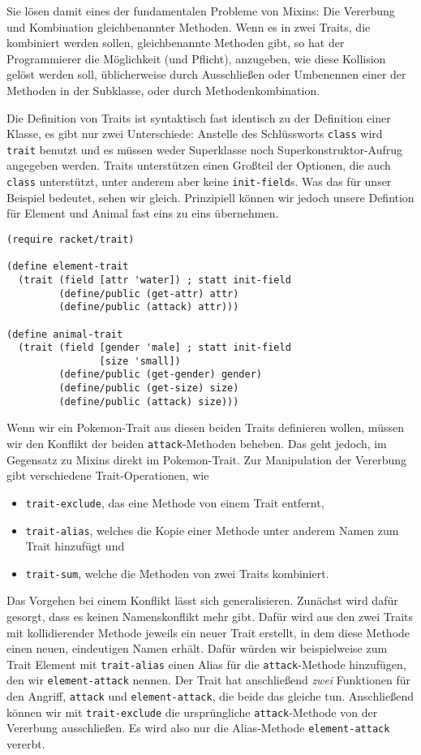 Sie lösen damit eines der fundamentalen Probleme von Mixins: Die Vererbung und Kombination gleichbenannter Methoden. Wenn es in zwei Traits, die kombiniert werden sollen, gleichbenannte Methoden gibt, so hat der Programmierer die Möglichkeit (und Pflicht), anzugeben, wie diese Kollision gelöst werden soll, üblicherweise durch Ausschließen oder Umbenennen einer der Methoden in der Subklasse, oder durch Methodenkombination.

Die Definition von Traits ist syntaktisch fast identisch zu der Definition einer Klasse, es gibt nur zwei Unterschiede: Anstelle des Schlüssworts \texttt{class} wird \texttt{trait} benutzt und es müssen weder Superklasse noch Superkonstruktor-Aufrug angegeben werden. Traits unterstützen einen Großteil der Optionen, die auch \texttt{class} unterstützt, unter anderem aber keine \texttt{init-field}s. Was das für unser Beispiel bedeutet, sehen wir gleich. Prinzipiell können wir jedoch unsere Defintion für Element und Animal fast eins zu eins übernehmen. 

\begin{lstlisting}
(require racket/trait)

(define element-trait
  (trait (field [attr 'water]) ; statt init-field
         (define/public (get-attr) attr)
         (define/public (attack) attr)))

(define animal-trait
  (trait (field [gender 'male] ; statt init-field
                [size 'small])
         (define/public (get-gender) gender)
         (define/public (get-size) size)
         (define/public (attack) size)))
\end{lstlisting}

Wenn wir ein Pokemon-Trait aus diesen beiden Traits definieren wollen, müssen wir den Konflikt der beiden \texttt{attack}-Methoden beheben. Das geht jedoch, im Gegensatz zu Mixins direkt im Pokemon-Trait. Zur Manipulation der Vererbung gibt verschiedene Trait-Operationen, wie
\begin{itemize}
 \item \texttt{trait-exclude}, das eine Methode von einem Trait entfernt,
 \item \texttt{trait-alias}, welches die Kopie einer Methode unter anderem Namen zum Trait hinzufügt und
 \item \texttt{trait-sum}, welche die Methoden von zwei Traits kombiniert.
\end{itemize}

Das Vorgehen bei einem Konflikt lässt sich generalisieren. Zunächst wird dafür gesorgt, dass es keinen Namenskonflikt mehr gibt. Dafür wird aus den zwei Traits mit kollidierender Methode jeweils ein neuer Trait erstellt, in dem diese Methode einen neuen, eindeutigen Namen erhält. Dafür würden wir beispielweise zum Trait Element mit \texttt{trait-alias} einen Alias für die \texttt{attack}-Methode hinzufügen, den wir \texttt{element-attack} nennen. Der Trait hat anschließend \emph{zwei} Funktionen für den Angriff, \texttt{attack} und \texttt{element-attack}, die beide das gleiche tun. Anschließend können wir mit \texttt{trait-exclude} die ursprüngliche \texttt{attack}-Methode von der Vererbung ausschließen. Es wird also nur die Alias-Methode \texttt{element-attack} vererbt.

